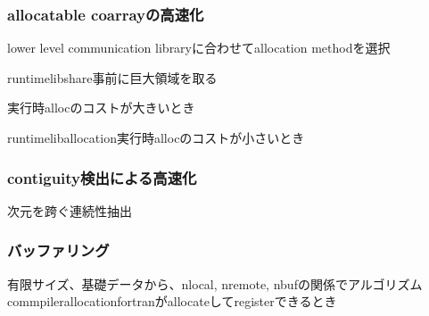 \subsubsection{allocatable coarrayの高速化}

lower level communication libraryに合わせてallocation methodを選択

runtimelibshare事前に巨大領域を取る

実行時allocのコストが大きいとき


runtimeliballocation実行時allocのコストが小さいとき

\subsubsection{contiguity検出による高速化}
次元を跨ぐ連続性抽出

\subsubsection{バッファリング}
有限サイズ、基礎データから、nlocal, nremote, nbufの関係でアルゴリズム
commpilerallocationfortranがallocateしてregisterできるとき



